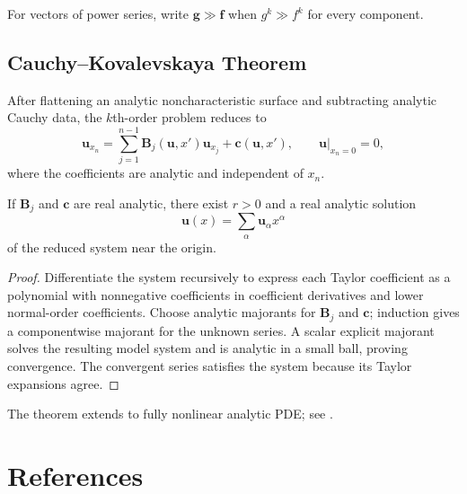 \begin{remark}
\label{rem:vector-valued-power-series-notation}
For vectors of power series, write $\mathbf g\gg\mathbf f$ when
$g^k\gg f^k$ for every component.
\end{remark}

\subsection{Cauchy--Kovalevskaya Theorem}
\label{sec:cauchy-kovalevskaya-theorem}

After flattening an analytic noncharacteristic surface and subtracting analytic
Cauchy data, the $k$th-order problem reduces to
\[
\mathbf u_{x_n}=\sum_{j=1}^{n-1}\mathbf B_j(\mathbf u,x')\mathbf u_{x_j}
+\mathbf c(\mathbf u,x'),\qquad \mathbf u|_{x_n=0}=0,
\]
where the coefficients are analytic and independent of $x_n$.

\begin{theorem}
\label{thm:cauchy-kovalevskaya}
If $\mathbf B_j$ and $\mathbf c$ are real analytic, there exist $r>0$ and a
real analytic solution
\[
\mathbf u(x)=\sum_\alpha\mathbf u_\alpha x^\alpha
\]
of the reduced system near the origin.
\end{theorem}

\begin{proof}
\sketch Differentiate the system recursively to express each Taylor
coefficient as a polynomial with nonnegative coefficients in coefficient
derivatives and lower normal-order coefficients. Choose analytic majorants
for $\mathbf B_j$ and $\mathbf c$; induction gives a componentwise majorant
for the unknown series. A scalar explicit majorant solves the resulting model
system and is analytic in a small ball, proving convergence. The convergent
series satisfies the system because its Taylor expansions agree.
\end{proof}

\begin{remark}
\label{rem:cauchy-kovalevskaya-fully-nonlinear}
The theorem extends to fully nonlinear analytic PDE; see \cite{Folland1976}.
\end{remark}

\section{References}
\label{sec:ch4-references}

\noindent\cite{Pinsky1991,Pinsky1991,Strauss1992,ThoeZachmanoglou1986,Weinberger1965,Olver1986,SteinWeiss1971,Stein1993,Hormander1983,Rauch1992,Treves1975,PinskyTaylor1997,CourantHilbert1962,Hormander1971,BensoussanLionsPapanicolaou1978,Folland1976,John1982,DiBenedetto1995,Mikhailov1978}
